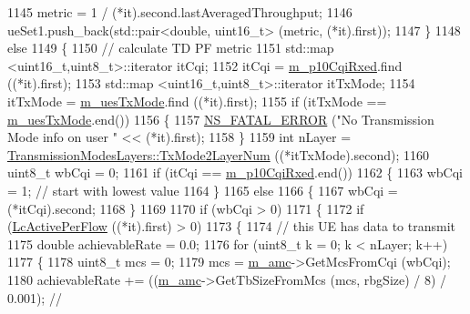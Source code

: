 \begin{DoxyCode}
1145               metric = 1 / (*it).second.lastAveragedThroughput;
1146               ueSet1.push\_back(std::pair<double, uint16\_t> (metric, (*it).first));
1147             \}
1148           \textcolor{keywordflow}{else}
1149             \{
1150               \textcolor{comment}{// calculate TD PF metric}
1151               std::map <uint16\_t,uint8\_t>::iterator itCqi;
1152               itCqi = \hyperlink{classns3_1_1PssFfMacScheduler_a268235ec4bf4d7e3a75840dec54bf22d}{m\_p10CqiRxed}.find ((*it).first);
1153               std::map <uint16\_t,uint8\_t>::iterator itTxMode;
1154               itTxMode = \hyperlink{classns3_1_1PssFfMacScheduler_a48aa1d9dc22e9c73e3c2206be76bb6cd}{m\_uesTxMode}.find ((*it).first);
1155               \textcolor{keywordflow}{if} (itTxMode == \hyperlink{classns3_1_1PssFfMacScheduler_a48aa1d9dc22e9c73e3c2206be76bb6cd}{m\_uesTxMode}.end())
1156                 \{
1157                   \hyperlink{group__fatal_ga5131d5e3f75d7d4cbfd706ac456fdc85}{NS\_FATAL\_ERROR} (\textcolor{stringliteral}{"No Transmission Mode info on user "} << (*it).first);
1158                 \}
1159               \textcolor{keywordtype}{int} nLayer = \hyperlink{classns3_1_1TransmissionModesLayers_a31f608b7bfaa77440fe4cb85ad035329}{TransmissionModesLayers::TxMode2LayerNum}
       ((*itTxMode).second);
1160               uint8\_t wbCqi = 0;
1161               \textcolor{keywordflow}{if} (itCqi == \hyperlink{classns3_1_1PssFfMacScheduler_a268235ec4bf4d7e3a75840dec54bf22d}{m\_p10CqiRxed}.end())
1162                 \{
1163                   wbCqi = 1; \textcolor{comment}{// start with lowest value}
1164                 \}
1165               \textcolor{keywordflow}{else}
1166                 \{
1167                   wbCqi = (*itCqi).second;
1168                 \}
1169     
1170               \textcolor{keywordflow}{if} (wbCqi > 0)
1171                 \{
1172                   \textcolor{keywordflow}{if} (\hyperlink{classns3_1_1PssFfMacScheduler_afa94be0f9d6a6f6ce3aee86abf764e27}{LcActivePerFlow} ((*it).first) > 0)
1173                     \{
1174                       \textcolor{comment}{// this UE has data to transmit}
1175                       \textcolor{keywordtype}{double} achievableRate = 0.0;
1176                       \textcolor{keywordflow}{for} (uint8\_t k = 0; k < nLayer; k++) 
1177                         \{
1178                           uint8\_t mcs = 0; 
1179                           mcs = \hyperlink{classns3_1_1PssFfMacScheduler_a0cbf5421430268701ab8a313ab912785}{m\_amc}->GetMcsFromCqi (wbCqi);
1180                           achievableRate += ((\hyperlink{classns3_1_1PssFfMacScheduler_a0cbf5421430268701ab8a313ab912785}{m\_amc}->GetTbSizeFromMcs (mcs, rbgSize) / 8) / 0.001); \textcolor{comment}{//
}
\end{DoxyCode}
